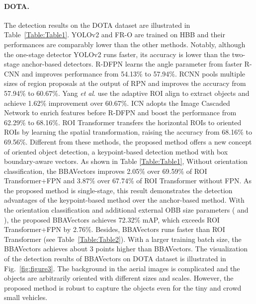 \documentclass[10pt,twocolumn,letterpaper]{article}
\begin{document}
\paragraph{DOTA.} The detection results on the DOTA dataset are illustrated in Table~\ref{Table:Table1}. YOLOv2 \cite{redmon2017yolo9000} and FR-O \cite{xia2018dota} are trained on HBB \cite{xia2018dota} and their performances are comparably lower than the other methods. Notably, although the one-stage detector YOLOv2 runs faster, its accuracy is lower than the two-stage anchor-based detectors. R-DFPN \cite{yang2018automatic} learns the angle parameter from faster R-CNN \cite{ren2015faster} and improves performance from 54.13\% to 57.94\%. RCNN \cite{jiang2017r2cnn} pools multiple sizes of region proposals at the output of RPN and improves the accuracy from 57.94\% to 60.67\%. Yang \textit{et al}. \cite{yang2018position} use the adaptive ROI align to extract objects and achieve 1.62\% improvement over 60.67\%. ICN \cite{azimi2018towards} adopts the Image Cascaded Network to enrich features before R-DFPN and boost the performance from 62.29\% to 68.16\%. ROI Transformer  \cite{ding2019learning} transfers the horizontal ROIs to oriented ROIs by learning the spatial transformation, raising the accuracy from 68.16\% to 69.56\%. Different from these methods, the proposed method offers a new concept of oriented object detection, a keypoint-based detection method with box boundary-aware vectors. As shown in Table \ref{Table:Table1}, Without orientation classification, the BBAVectors improves 2.05\% over 69.59\% of ROI Transformer+FPN \cite{lin2017feature} and 3.87\% over 67.74\% of ROI Transformer without FPN. As the proposed method is single-stage, this result demonstrates the detection advantages of the keypoint-based method over the anchor-based method. With the orientation classification and additional external OBB size parameters ( and ), the proposed BBAVectors achieves 72.32\% mAP, which exceeds ROI Transformer+FPN by 2.76\%. Besides, BBAVectors runs faster than ROI Transformer (see Table~\ref{Table:Table2}). With a larger training batch size, the BBAVectors achieves about 3 points higher than BBAVectors. The visualization of the detection results of BBAVectors on DOTA dataset is illustrated in Fig.~\ref{fig:figure3}. The background in the aerial images is complicated and the objects are arbitrarily oriented with different sizes and scales. However, the proposed method is robust to capture the objects even for the tiny and crowd small vehicles.
\end{document}
